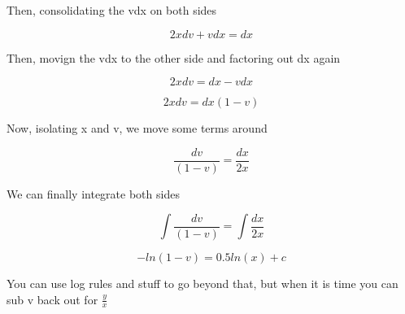 \documentclass[../main.tex]{subfiles}
\begin{document}
Then, consolidating the vdx on both sides

\[ 2xdv + vdx = dx \]

Then, movign the vdx to the other side and factoring out dx again


\[ 2xdv= dx - vdx \]

\[ 2xdv= dx(1 - v) \]

Now, isolating x and v, we move some terms around


\[ \frac{dv}{(1-v)} = \frac{dx}{2x} \]

We can finally integrate both sides


\[ \int{\frac{dv}{(1-v)}} = \int{\frac{dx}{2x}} \]

\[ -ln(1-v) = 0.5 ln(x) + c \]

You can use log rules and stuff to go beyond that, but when it is time you can sub v back out for $\frac{y}{x}$ 
\end{document}
